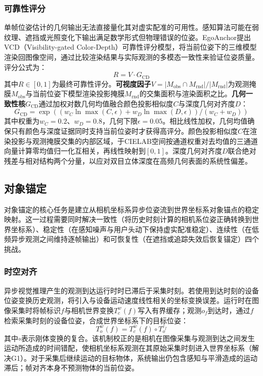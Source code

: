 \documentclass[review]{vgtc}
\begin{document}
\subsubsection{可靠性评分}\label{sec:reliability}

单帧位姿估计的几何输出无法直接量化其对虚实配准的可用性。感知算法可能在弱纹理、遮挡或光照变化下输出满足数学形式但物理错误的位姿。EgoAnchor提出VCD（Visibility-gated Color-Depth）可靠性评分模型，将当前位姿下的三维模型渲染回图像空间，通过比较渲染结果与实际观测的多模态一致性来验证位姿质量。评分公式为：
\begin{equation}
R = V \cdot G_{\mathrm{CD}}
\end{equation}
其中$R \in [0,1]$为最终可靠性评分。\textbf{可视度因子}$V = \lvert M_{\mathrm{obs}} \cap M_{\mathrm{rnd}} \rvert / \lvert M_{\mathrm{rnd}} \rvert$为观测掩膜$M_{\mathrm{obs}}$与当前位姿下模型渲染投影掩膜$M_{\mathrm{rnd}}$的交集面积与渲染面积之比。\textbf{几何一致性核}$G_{\mathrm{CD}}$通过加权对数几何均值融合颜色投影相似度$C$与深度几何对齐度$D$：
\begin{equation}
G_{\mathrm{CD}} = \exp\!\left((w_C \ln \max\!\left(C, \epsilon\right) + w_D \ln \max\!\left(D, \epsilon\right)) / (w_C + w_D)\right)
\end{equation}
其中权重为$w_C = 0.2$、$w_D = 0.8$，几何下限$\epsilon = 0.05$。相比线性加权，几何均值确保只有颜色与深度证据同时支持当前位姿时才获得高评分。颜色投影相似度$C$在渲染投影与观测掩膜交集的内部区域，于CIELAB空间按通道权重对去均值的三通道向量计算零均值归一化互相关，再线性映射到$[0,1]$。深度几何对齐度$D$联合绝对残差与相对结构两个分量，以应对双目立体深度在高频几何表面的系统性偏差。

\subsection{对象锚定}\label{sec:anchoring}

对象锚定的核心任务是建立从相机坐标系异步位姿流到世界坐标系对象锚点的稳定映射。这一过程需要同时解决一致性（将历史时刻计算的相机系位姿正确转换到世界坐标系）、稳定性（在感知噪声与用户头动下保持虚实配准稳定）、连续性（在低频异步观测之间维持逐帧输出）和可恢复性（在遮挡或追踪失效后恢复锚定）四个挑战。

\subsubsection{时空对齐}\label{sec:alignment}

异步视觉推理产生的观测到达运行时时已滞后于采集时刻。若使用到达时刻的设备位姿变换历史观测，将引入与设备运动速度线性相关的坐标变换误差。运行时在图像采集时将帧标识$f$与相机世界变换$T_c^w(f)$写入有界缓存；观测$o_f$到达时，通过$f$检索采集时刻的设备位姿，合成世界坐标系下的目标位姿：
\begin{equation}
T_o^w (f) = T_c^w (f) \circ T_o^{c_f}
\label{eq:world-transform}
\end{equation}
其中$\circ$表示刚体变换的复合。该机制校正的是相机在图像采集与观测到达之间发生运动所造成的时间错配，使相机坐标系观测在其原始采集时刻进入世界坐标系（解决G1）。对于采集后继续运动的目标物体，系统输出仍包含感知与平滑造成的运动滞后；帧对齐本身不预测物体的当前位姿。
\end{document}
